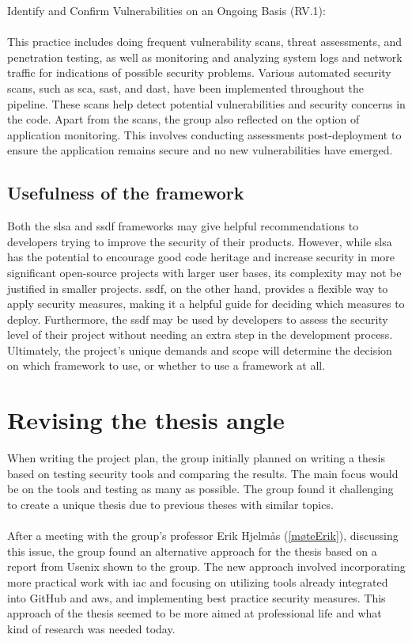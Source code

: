 Identify and Confirm Vulnerabilities on an Ongoing Basis (RV.1): \textit{}\cite{ssdf}
\\~\\
This practice includes doing frequent vulnerability scans, threat assessments, and penetration testing, as well as monitoring and analyzing system logs and network traffic for indications of possible security problems. Various automated security scans, such as \acrshort{sca}, \acrshort{sast}, and \acrshort{dast}, have been implemented throughout the \gls{pipeline}. These scans help detect potential vulnerabilities and security concerns in the code. Apart from the scans, the group also reflected on the option of application monitoring. This involves conducting assessments post-deployment to ensure the application remains secure and no new vulnerabilities have emerged.

\subsection{Usefulness of the framework}

Both the \acrshort{slsa} and \acrshort{ssdf} frameworks may give helpful recommendations to developers trying to improve the security of their products. However, while \acrshort{slsa} has the potential to encourage good code heritage and increase security in more significant open-source projects with larger user bases, its complexity may not be justified in smaller projects. \acrshort{ssdf}, on the other hand, provides a flexible way to apply security measures, making it a helpful guide for deciding which measures to deploy. Furthermore, the \acrshort{ssdf} may be used by developers to assess the security level of their project without needing an extra step in the development process. Ultimately, the project's unique demands and scope will determine the decision on which framework to use, or whether to use a framework at all.

\section{Revising the thesis angle}
When writing the project plan, the group initially planned on writing a thesis based on testing security tools and comparing the results. The main focus would be on the tools and testing as many as possible. The group found it challenging to create a unique thesis due to previous theses with similar topics. 
\\~\\
After a meeting with the group's professor Erik Hjelmås  (\ref{møteErik}), discussing this issue, the group found an alternative approach for the thesis based on a report from Usenix \cite{usenixreport} shown to the group. The new approach involved incorporating more practical work with \gls{iac} and focusing on utilizing tools already integrated into GitHub and \acrshort{aws}, and implementing best practice security measures. This approach of the thesis seemed to be more aimed at professional life and what kind of research was needed today.

